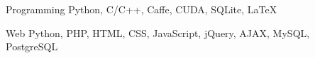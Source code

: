 

\begin{cvskills}

  \cvskill
    {Programming} %
    {Python, C/C++, Caffe, CUDA, SQLite, \LaTeX} %

  \cvskill
    {Web} %
    {Python, PHP, HTML, CSS, JavaScript, jQuery, AJAX, MySQL, PostgreSQL} %

\end{cvskills}
